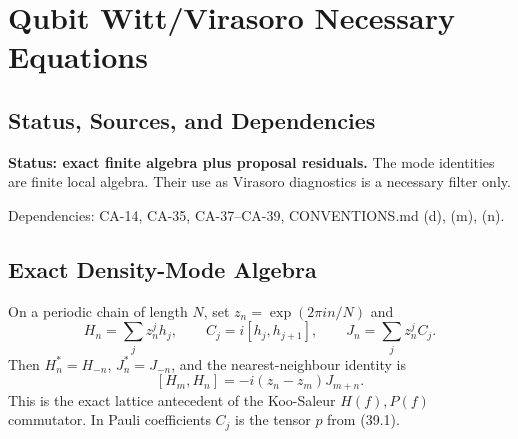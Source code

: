 
\section{Qubit Witt/Virasoro Necessary Equations}
\label{sec:qubit-witt-virasoro-necessary-equations}

\subsection{Status, Sources, and Dependencies}

\textbf{Status: exact finite algebra plus proposal residuals.}  The mode
identities are finite local algebra.  Their use as Virasoro diagnostics is a
necessary filter only.

Dependencies: CA-14, CA-35, CA-37--CA-39, CONVENTIONS.md (d), (m), (n).


\subsection{Exact Density-Mode Algebra}

On a periodic chain of length \(N\), set \(z_n=\exp(2\pi in/N)\) and
\[
  H_n=\sum_jz_n^jh_j,\qquad
  C_j=i[h_j,h_{j+1}],\qquad
  J_n=\sum_jz_n^jC_j .
\]
Then \(H_n^*=H_{-n}\), \(J_n^*=J_{-n}\), and the nearest-neighbour identity is
\[
  [H_m,H_n]=-i(z_n-z_m)J_{m+n}.
  \tag{42.1}
\]
This is the exact lattice antecedent of the Koo-Saleur \(H(f),P(f)\)
commutator.  In Pauli coefficients \(C_j\) is the tensor \(p\) from (39.1).


